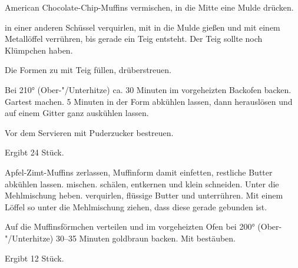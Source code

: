 \begin{recipe}{American Chocolate-Chip-Muffins}
  vermischen, in die Mitte eine Mulde drücken.

  in einer anderen Schüssel verquirlen, mit
  in die Mulde gießen und mit einem Metallöffel verrühren, bis gerade
  ein Teig entsteht. Der Teig sollte noch Klümpchen haben.
  
  Die Formen zu  mit Teig füllen,
  drüberstreuen.

  Bei 210° (Ober-"/Unterhitze) ca. 30 Minuten im vorgeheizten
  Backofen backen. Gartest machen. 5 Minuten in der Form
  abkühlen lassen, dann herauslösen und auf einem Gitter ganz
  auskühlen lassen.

  Vor dem Servieren mit Puderzucker bestreuen.
  
  Ergibt 24 Stück.
\end{recipe}

\begin{recipe}{Apfel-Zimt-Muffins}
  zerlassen, Muffinform damit einfetten, restliche Butter abkühlen
  lassen.
  mischen.
  schälen, entkernen und klein schneiden. Unter die Mehlmischung heben.
  verquirlen, flüssige Butter und
  unterrühren. Mit einem Löffel so unter die Mehlmischung ziehen, dass
  diese gerade gebunden ist.

  Auf die Muffinsförmchen verteilen und im vorgeheizten Ofen bei 200°
  (Ober-"/Unterhitze) 30–35 Minuten goldbraun backen. Mit
  bestäuben.
  
  Ergibt 12 Stück.
\end{recipe}

